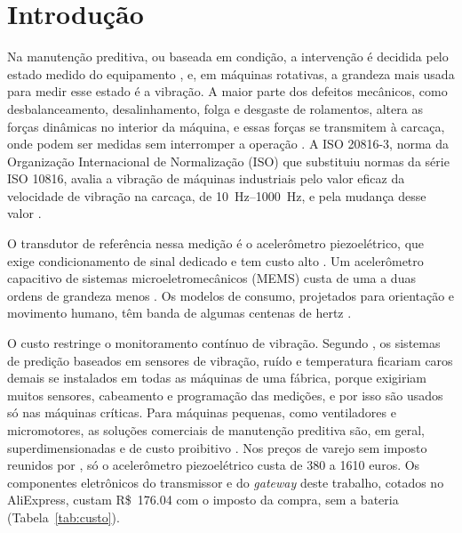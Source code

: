 \chapter{Introdução}\label{cap:introducao}

Na manutenção preditiva, ou baseada em condição, a intervenção é decidida pelo estado medido do equipamento \cite{mobley2002}, e, em máquinas rotativas, a grandeza mais usada para medir esse estado é a vibração. A maior parte dos defeitos mecânicos, como desbalanceamento, desalinhamento, folga e desgaste de rolamentos, altera as forças dinâmicas no interior da máquina, e essas forças se transmitem à carcaça, onde podem ser medidas sem interromper a operação \cite{randall2011livro}. A ISO 20816-3, norma da Organização Internacional de Normalização (ISO) que substituiu normas da série ISO 10816, avalia a vibração de máquinas industriais pelo valor eficaz da velocidade de vibração na carcaça, de \SIrange{10}{1000}{\hertz}, e pela mudança desse valor \cite{iso208163_2022}.

O transdutor de referência nessa medição é o acelerômetro piezoelétrico, que exige condicionamento de sinal dedicado e tem custo alto \cite{albarbar2008}. Um acelerômetro capacitivo de sistemas microeletromecânicos (MEMS) custa de uma a duas ordens de grandeza menos \cite[p.~3]{komarizadehasl2021}. Os modelos de consumo, projetados para orientação e movimento humano, têm banda de algumas centenas de hertz \cite{albarbar2008,fidali2024}.

O custo restringe o monitoramento contínuo de vibração. Segundo , os sistemas de predição baseados em sensores de vibração, ruído e temperatura ficariam caros demais se instalados em todas as máquinas de uma fábrica, porque exigiriam muitos sensores, cabeamento e programação das medições, e por isso são usados só nas máquinas críticas. Para máquinas pequenas, como ventiladores e micromotores, as soluções comerciais de manutenção preditiva são, em geral, superdimensionadas e de custo proibitivo \cite[p.~1]{kolok2025}. Nos preços de varejo sem imposto reunidos por , só o acelerômetro piezoelétrico custa de \num{380} a \num{1610} euros. Os componentes eletrônicos do transmissor e do \textit{gateway} deste trabalho, cotados no AliExpress, custam R\$~\num{176,04} com o imposto da compra, sem a bateria (Tabela~\ref{tab:custo}).


